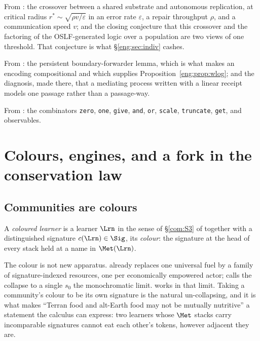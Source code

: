 From \cite{compaut}: the crossover between a shared substrate and
autonomous replication, at critical radius $r^\ast \sim
\sqrt{\rho v / \varepsilon}$ in an error rate $\varepsilon$, a repair
throughput $\rho$, and a communication speed $v$; and the closing
conjecture that this crossover and the factoring of the OSLF-generated
logic over a population are two views of one threshold. That conjecture is
what \S\ref{eng:sec:indiv} cashes.

From \cite{KnotsNote}: the persistent boundary-forwarder lemma, which is what
makes an encoding compositional and which supplies
Proposition~\ref{eng:prop:wlog}; and the diagnosis, made there, that a
mediating process written with a linear receipt models one passage rather
than a passage-way.

From \cite{SPJ2000}: the combinators \texttt{zero}, \texttt{one},
\texttt{give}, \texttt{and}, \texttt{or}, \texttt{scale},
\texttt{truncate}, \texttt{get}, and observables.

\section{Colours, engines, and a fork in the conservation law}\label{eng:S3}
\label{eng:sec:fork}

\subsection{Communities are colours}\label{eng:S3.1}

\begin{definition}\label{eng:coloured-learner}
A \emph{coloured learner} is a learner $\Lrn$ in the sense of
\S\ref{com:S3} of \chComp together with a distinguished signature
$c(\Lrn) \in \Sig$, its \emph{colour}: the signature at the head of every
stack held at a name in $\Met(\Lrn)$.
\end{definition}

The colour is not new apparatus. \cite{CARho} already replaces one
universal fuel by a family of signature-indexed resources, one per
economically empowered actor; \cite[\S6]{CARho} calls the collapse to a
single $s_0$ the monochromatic limit. \chComp works in that limit.
Taking a community's colour to be its own signature is the natural
un-collapsing, and it is what makes ``Terran food and alt-Earth food may
not be mutually nutritive'' a statement the calculus can express: two
learners whose $\Met$ stacks carry incomparable signatures cannot eat each
other's tokens, however adjacent they are.

